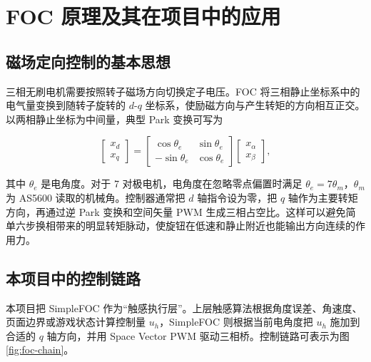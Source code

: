 \section{FOC 原理及其在项目中的应用}

\subsection{磁场定向控制的基本思想}

三相无刷电机需要按照转子磁场方向切换定子电压。FOC 将三相静止坐标系中的电气量变换到随转子旋转的 $d$-$q$ 坐标系，使励磁方向与产生转矩的方向相互正交。以两相静止坐标为中间量，典型 Park 变换可写为

\begin{equation}
\begin{bmatrix}x_d\\x_q\end{bmatrix}
=
\begin{bmatrix}
\cos\theta_e & \sin\theta_e\\
-\sin\theta_e & \cos\theta_e
\end{bmatrix}
\begin{bmatrix}x_\alpha\\x_\beta\end{bmatrix},
\end{equation}

其中 $\theta_e$ 是电角度。对于 7 对极电机，电角度在忽略零点偏置时满足 $\theta_e=7\theta_m$，$\theta_m$ 为 AS5600 读取的机械角。控制器通常把 $d$ 轴指令设为零，把 $q$ 轴作为主要转矩方向，再通过逆 Park 变换和空间矢量 PWM 生成三相占空比。这样可以避免简单六步换相带来的明显转矩脉动，使旋钮在低速和静止附近也能输出方向连续的作用力。

\subsection{本项目中的控制链路}

本项目把 SimpleFOC 作为“触感执行层”。上层触感算法根据角度误差、角速度、页面边界或游戏状态计算控制量 $u_h$，SimpleFOC 则根据当前电角度把 $u_h$ 施加到合适的 $q$ 轴方向，并用 Space Vector PWM 驱动三相桥。控制链路可表示为图 \ref{fig:foc-chain}。

